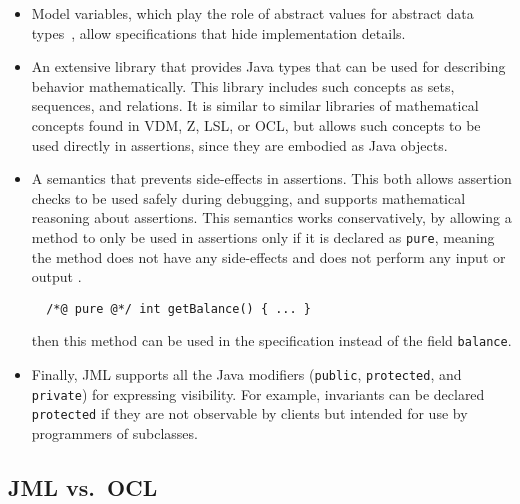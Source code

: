 \medskip


\begin{itemize}
\item Model variables, which play the role of abstract values for
  abstract data types~\cite{Cheon-etal03}, allow specifications that
  hide implementation details.
    
\item An extensive library that provides Java types that can be used
  for describing behavior mathematically.  This library includes such
  concepts as sets, sequences, and relations.  It is similar to
  similar libraries of mathematical concepts found in VDM, Z, LSL, or
  OCL, but allows such concepts to be used directly in assertions,
  since they are embodied as Java objects.
  
\item A semantics that prevents side-effects in assertions.  This
  both allows assertion checks to be used safely during debugging, and
  supports mathematical reasoning about assertions.
  This semantics works conservatively, by allowing a method to only be
  used in assertions only if it is declared as 
  {\tt pure}, meaning the method does not have any side-effects and
  does not perform any input or output \cite{Leavens-Baker-Ruby03}.
\begin{verbatim}
  /*@ pure @*/ int getBalance() { ... }
\end{verbatim}
  then this method can be used in the specification instead of the field
  {\tt balance}.
\item Finally, JML supports all the Java modifiers ({\tt public},
  {\tt protected}, and {\tt private}) for expressing visibility.  For
  example, invariants can be declared {\tt protected} if
  they are not observable by clients but intended for use by
  programmers of subclasses.  
\end{itemize}

\subsection{JML vs.\ OCL}
\label{related}

